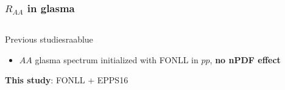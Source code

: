 \documentclass[aspectratio=169,11pt,usenames,dvipsnames]{beamer}
\begin{document}
\begin{frame}[noframenumbering]
    \frametitle{$R_{AA}$ in glasma}
    {\vspace{-15pt}
    \begin{center}
        \begin{columns}[onlytextwidth,t]
           \begin{center}
                \begin{custombox2transp}{\normalsize{} Previous studies}{raablue}
                    \small
                    \begin{varwidth}{0.88\textwidth}
                    \begin{itemize}\itemsep0em 
                        \itemsep0em
                        \footnotesize
                        \item {}$AA$ glasma spectrum initialized with FONLL in $pp$, {\bfseries\color{raablue}no nPDF effect}
                    \end{itemize}
                    \end{varwidth}
                \end{custombox2transp}
                \begin{untitledcustomboxtransp}
                    \begin{varwidth}{0.88\textwidth}
                        \hspace{10pt}\normalsize{\bfseries\color{palteal} This study}: FONLL + {\color{palteal}EPPS16}\hspace{10pt}
                    \end{varwidth}
                \end{untitledcustomboxtransp}
            \end{center}


\end{columns}
\end{center}}
\end{frame}
\end{document}
